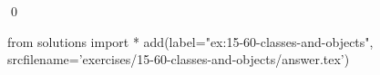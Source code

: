 
\begin{ex}
  \label{ex:15-60-classes-and-objects}
  
  \qed
\end{ex}
\begin{python0}
from solutions import *
add(label="ex:15-60-classes-and-objects",
    srcfilename='exercises/15-60-classes-and-objects/answer.tex')
\end{python0}
